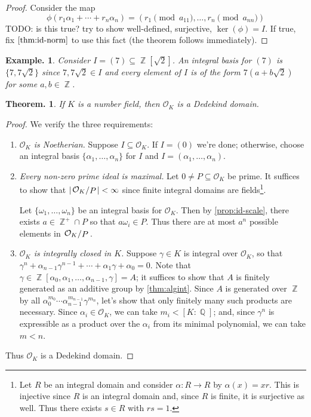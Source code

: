 \documentclass[11pt, a4paper]{memoir}
\DeclareMathOperator{\Q}{{\mathbb{Q}}}
\DeclareMathOperator{\Z}{{\mathbb{Z}}}
\newcommand{\abs}[1]{\ensuremath{\left\lvert#1\right\rvert}}
\theoremstyle{change}
\newtheorem{theorem}{Theorem.}[section]
\theoremstyle{plain}
\theoremstyle{nonumberplain}
\newtheorem{example}{Example.}
\newtheorem{proof}{Proof}
\newcommand{\quot}[2]{\mathchoice{\left.\raisebox{0.13em}{$#1$}\middle/\raisebox{-0.13em}{$#2$}\right.}
                                 {\left.\raisebox{0.07em}{$#1$}\middle/\raisebox{-0.07em}{$#2$}\right.}
                                 {\left.\raisebox{0.03em}{$#1$}\middle/\raisebox{-0.03em}{$#2$}\right.}
                                 {\left.\raisebox{0em}{$#1$}\middle/\raisebox{0em}{$#2$}\right.}}
\numberwithin{equation}{section}
\begin{document}
\begin{proof}
    Consider the map
    \begin{equation*}
        \phi(r_1\alpha_1+\cdots+r_n\alpha_n)=(r_1\pmod{a_{11}},\ldots,r_n\pmod{a_{nn}})
    \end{equation*}
    TODO: is this true? try to show well-defined, surjective, $\ker(\phi)=I$.
    If true, fix $\cref{thm:id-norm}$ to use this fact (the theorem follows immediately).
\end{proof}
\begin{example}
    Consider $I=(7)\subseteq\Z[\sqrt{2}]$.
    An integral basis for $(7)$ is $\{7,7\sqrt{2}\}$ since $7,7\sqrt{2}\in I$ and every element of $I$ is of the form $7(a+b\sqrt{2})$ for some $a,b\in\Z$.
\end{example}
\begin{theorem}
    If $K$ is a number field, then $\mathcal{O}_K$ is a Dedekind domain.
\end{theorem}
\begin{proof}
    We verify the three requirements:
    \begin{enumerate}
        \item \textit{$\mathcal{O}_K$ is Noetherian.}
            Suppose $I\subseteq\mathcal{O}_K$.
            If $I=(0)$ we're done; otherwise, choose an integral basis $\{\alpha_1,\ldots,\alpha_n\}$ for $I$ and $I=(\alpha_1,\ldots,\alpha_n)$.
        \item \textit{Every non-zero prime ideal is maximal.}
            Let $0\neq P\subseteq\mathcal{O}_K$ be prime.
            It suffices to show that $\abs{\quot{\mathcal{O}_K}{P}}<\infty$ since finite integral domains are fields\footnote{Let $R$ be an integral domain and consider $\alpha:R\to R$ by $\alpha(x)=xr$.
                This is injective since $R$ is an integral domain and, since $R$ is finite, it is surjective as well.
            Thus there exists $s\in R$ with $rs=1$.}.

            Let $\{\omega_1,\ldots,\omega_n\}$ be an integral basis for $\mathcal{O}_K$.
            Then by \cref{prop:id-scale}, there exists $a\in\Z^+\cap P$ so that $a\omega_i\in P$.
            Thus there are at most $a^n$ possible elements in $\quot{\mathcal{O}_K}{P}$.
        \item \textit{$\mathcal{O}_K$ is integrally closed in $K$.}
            Suppose $\gamma\in K$ is integral over $\mathcal{O}_K$, so that $\gamma^n+\alpha_{n-1}\gamma^{n-1}+\cdots+\alpha_1\gamma+\alpha_0=0$.
            Note that $\gamma\in\Z[\alpha_0,\alpha_1,\ldots,\alpha_{n-1},\gamma]=A$; it suffices to show that $A$ is finitely generated as an additive group by \cref{thm:algint}.
            Since $A$ is generated over $\Z$ by all $\alpha_0^{m_0}\cdots\alpha_{n-1}^{m_{n-1}}\gamma^{m_n}$, let's show that only finitely many such products are necessary.
            Since $\alpha_i\in\mathcal{O}_K$, we can take $m_i<[K:\Q]$; and, since $\gamma^n$ is expressible as a product over the $\alpha_i$ from its minimal polynomial, we can take $m<n$.
    \end{enumerate}
    Thus $\mathcal{O}_K$ is a Dedekind domain.
\end{proof}
\end{document}
